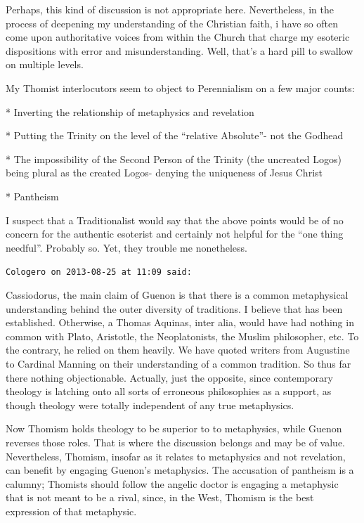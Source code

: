 \begin{footnotesize}
\begin{sffamily}
Perhaps, this kind of discussion is not appropriate here. Nevertheless, in the process of deepening my understanding of the Christian faith, i have so often come upon authoritative voices from within the Church that charge my esoteric dispositions with error and misunderstanding. Well, that's a hard pill to swallow on multiple levels.

My Thomist interlocutors seem to object to Perennialism on a few major counts:

* Inverting the relationship of metaphysics and revelation

* Putting the Trinity on the level of the ``relative Absolute''- not the Godhead

* The impossibility of the Second Person of the Trinity (the uncreated Logos) being plural as the created Logos- denying the uniqueness of Jesus Christ

* Pantheism

I suspect that a Traditionalist would say that the above points would be of no concern for the authentic esoterist and certainly not helpful for the ``one thing needful''. Probably so. Yet, they trouble me nonetheless.

\hfill

\texttt{Cologero on 2013-08-25 at 11:09 said:}

Cassiodorus, the main claim of Guenon is that there is a common metaphysical understanding behind the outer diversity of traditions. I believe that has been established. Otherwise, a Thomas Aquinas, inter alia, would have had nothing in common with Plato, Aristotle, the Neoplatonists, the Muslim philosopher, etc. To the contrary, he relied on them heavily. We have quoted writers from Augustine to Cardinal Manning on their understanding of a common tradition. So thus far there nothing objectionable. Actually, just the opposite, since contemporary theology is latching onto all sorts of erroneous philosophies as a support, as though theology were totally independent of any true metaphysics.

Now Thomism holds theology to be superior to to metaphysics, while Guenon reverses those roles. That is where the discussion belongs and may be of value. Nevertheless, Thomism, insofar as it relates to metaphysics and not revelation, can benefit by engaging Guenon's metaphysics. The accusation of pantheism is a calumny; Thomists should follow the angelic doctor is engaging a metaphysic that is not meant to be a rival, since, in the West, Thomism is the best expression of that metaphysic.


\end{sffamily}
\end{footnotesize}

